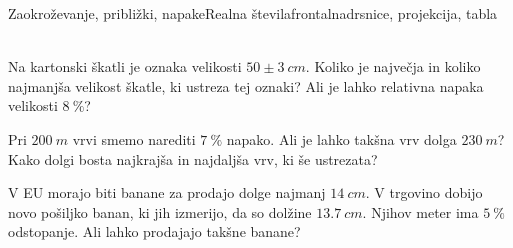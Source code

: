 \begin{priprava}{26}{}{Zaokroževanje, približki, napake}{Realna števila}{frontalna}{drsnice, projekcija, tabla}
~~\\



    \begin{naloga}
        Na kartonski škatli je oznaka velikosti $50 \pm 3 ~cm$.
        Koliko je največja in koliko najmanjša velikost škatle, ki ustreza tej oznaki? 
        Ali je lahko relativna napaka velikosti $8~\%$?            
    \end{naloga}
    
    \begin{naloga}
        Pri $200~m$ vrvi smemo narediti $7~\%$ napako.
        Ali je lahko takšna vrv dolga $230~m$?
        Kako dolgi bosta najkrajša in najdaljša vrv, ki še ustrezata?            
    \end{naloga}
    
    \begin{naloga}
        V EU morajo biti banane za prodajo dolge najmanj $14~cm$. 
        V trgovino dobijo novo pošiljko banan, ki jih izmerijo, da so dolžine $13.7~cm$. 
        Njihov meter ima $5~\%$ odstopanje. 
        Ali lahko prodajajo takšne banane?            
    \end{naloga}



\end{priprava}